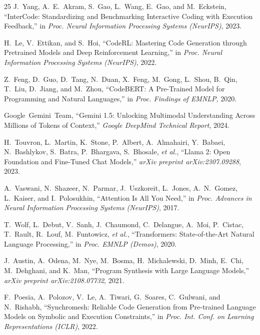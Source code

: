 \documentclass{ieeeaccess}
\begin{document}
\begin{thebibliography}{25}
J.~Yang, A.~E.~Akram, S.~Gao, L.~Wang, E.~Gao, and M.~Eckstein,
``InterCode: Standardizing and Benchmarking Interactive Coding with Execution Feedback,''
in \textit{Proc. Neural Information Processing Systems (NeurIPS)}, 2023.

H.~Le, V.~Ettikan, and S.~Hoi,
``CodeRL: Mastering Code Generation through Pretrained Models and Deep Reinforcement Learning,''
in \textit{Proc. Neural Information Processing Systems (NeurIPS)}, 2022.

Z.~Feng, D.~Guo, D.~Tang, N.~Duan, X.~Feng, M.~Gong, L.~Shou, B.~Qin, T.~Liu, D.~Jiang, and M.~Zhou,
``CodeBERT: A Pre-Trained Model for Programming and Natural Languages,''
in \textit{Proc. Findings of EMNLP}, 2020.

Google~Gemini~Team,
``Gemini 1.5: Unlocking Multimodal Understanding Across Millions of Tokens of Context,''
\textit{Google DeepMind Technical Report}, 2024.

H.~Touvron, L.~Martin, K.~Stone, P.~Albert, A.~Almahairi, Y.~Babaei, N.~Bashlykov, S.~Batra, P.~Bhargava, S.~Bhosale, \textit{et al.},
``Llama 2: Open Foundation and Fine-Tuned Chat Models,''
\textit{arXiv preprint arXiv:2307.09288}, 2023.

A.~Vaswani, N.~Shazeer, N.~Parmar, J.~Uszkoreit, L.~Jones, A.~N.~Gomez, L.~Kaiser, and I.~Polosukhin,
``Attention Is All You Need,''
in \textit{Proc. Advances in Neural Information Processing Systems (NeurIPS)}, 2017.

T.~Wolf, L.~Debut, V.~Sanh, J.~Chaumond, C.~Delangue, A.~Moi, P.~Cistac, T.~Rault, R.~Louf, M.~Funtowicz, \textit{et al.},
``Transformers: State-of-the-Art Natural Language Processing,''
in \textit{Proc. EMNLP (Demos)}, 2020.

J.~Austin, A.~Odena, M.~Nye, M.~Bosma, H.~Michalewski, D.~Minh, E.~Chi, M.~Dehghani, and K.~Man,
``Program Synthesis with Large Language Models,''
\textit{arXiv preprint arXiv:2108.07732}, 2021.

F.~Poesia, A.~Polozov, V.~Le, A.~Tiwari, G.~Soares, C.~Gulwani, and N.~Rishabh,
``Synchromesh: Reliable Code Generation from Pre-trained Language Models on Symbolic and Execution Constraints,''
in \textit{Proc. Int. Conf. on Learning Representations (ICLR)}, 2022.

\end{thebibliography}

\EOD
\end{document}
